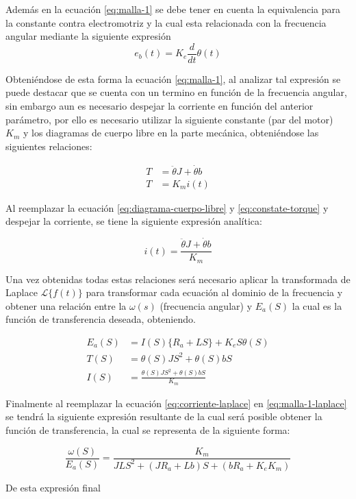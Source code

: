 \documentclass[conference]{IEEEtran}
\begin{document}
	Además en la ecuación \ref{eq:malla-1} se debe tener en cuenta la equivalencia para la constante contra electromotriz y la cual esta relacionada con la frecuencia angular mediante la siguiente expresión
	\begin{equation}
		e_b(t) = K_e\frac{d}{dt} \theta(t)
		\label{eq:contra-electromotriz}
	\end{equation}
	
	Obteniéndose de esta forma la ecuación \ref{eq:malla-1}, al analizar tal expresión se puede destacar que se cuenta con un termino en función de la frecuencia angular, sin embargo aun es necesario despejar la corriente en función del anterior parámetro, por ello es necesario utilizar la siguiente constante (par del motor) $K_m$ y los diagramas de cuerpo libre en la parte mecánica, obteniéndose las siguientes relaciones:
	
	\begin{align}
		T &= \ddot{\theta}J + \dot{\theta}b \label{eq:diagrama-cuerpo-libre}\\ 
		T &= K_mi(t) \label{eq:constate-torque}
	\end{align}
	
	Al reemplazar la ecuación \ref{eq:diagrama-cuerpo-libre} y \ref{eq:constate-torque} y despejar la corriente, se tiene la siguiente expresión analítica:
	
	\begin{equation}
		i(t) = \frac{ \ddot{\theta}J + \dot{\theta}b }{ K_m }
		\label{eq:corriente-torque}
	\end{equation}
	
	Una vez obtenidas todas estas relaciones será necesario aplicar la transformada de Laplace $\mathcal{L}\{f(t)\}$ para transformar cada ecuación al dominio de la frecuencia y obtener una relación entre la $\omega(s)$ (frecuencia angular) y $E_a(S)$ la cual es la función de transferencia deseada, obteniendo.
	
	\begin{align}
		E_a(S) &= I(S)\{R_a + LS\} + K_eS\theta(S) \label{eq:malla-1-laplace} \\
		T(S) &= \theta(S)JS^2 + \theta(S)bS \label{eq:torque-laplace} \\
		I(S) &= \frac{\theta(S)JS^2 + \theta(S)bS}{K_m} \label{eq:corriente-laplace}
	\end{align}
	
	Finalmente al reemplazar la ecuación \ref{eq:corriente-laplace} en \ref{eq:malla-1-laplace} se tendrá la siguiente expresión resultante de la cual será posible obtener la función de transferencia, la cual se representa de la siguiente forma:
	
	\begin{equation}
		\frac{\omega(S)}{E_a(S)} = \frac{K_m}{JLS^2 + (JR_a + Lb)S + (bR_a + K_eK_m)}
		\label{eq:ft-motor}
	\end{equation}
	
	De esta expresión final 
	
	
	
\end{document}
